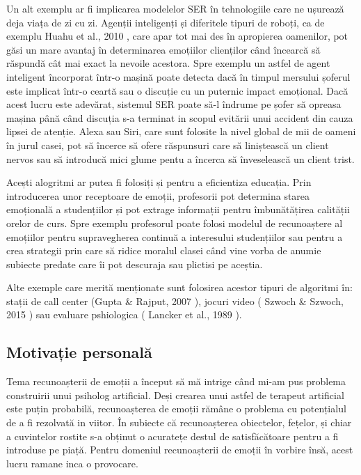 \documentclass[a4paper,12pt]{book}
\begin{document}
					Un alt exemplu ar fi implicarea modelelor SER în tehnologiile care ne ușurează deja viața de zi cu zi. Agenții inteligenți și diferitele tipuri de roboți, ca de exemplu Huahu et al., 2010 \cite{huahu}, care apar tot mai des în apropierea oamenilor, pot găsi un mare avantaj în determinarea emoțiilor clienților când încearcă să răspundă cât mai exact la nevoile acestora. Spre exemplu un astfel de agent inteligent încorporat într-o mașină poate detecta dacă în timpul mersului șoferul este implicat într-o ceartă sau o discuție cu un puternic impact emoțional. Dacă acest lucru este adevărat, sistemul SER poate să-l îndrume pe șofer să opreasa mașina până când discuția s-a terminat in scopul evitării unui accident din cauza lipsei de atenție. Alexa sau Siri, care sunt folosite la nivel  global de mii de oameni în jurul casei, pot să încerce să ofere răspunsuri care să liniștească un client nervos sau să introducă mici glume pentu a încerca să înveselească un client trist.\par 
					
					Acești alogritmi ar putea fi folosiți și pentru a eficientiza educația. Prin introducerea unor receptoare de emoții, profesorii pot determina starea emoțională a studențiilor și pot extrage informații pentru îmbunătățirea calității orelor de curs. Spre exemplu profesorul poate folosi modelul de recunoaștere al emoțiilor pentru supravegherea continuă a interesului studențiilor sau pentru a crea strategii prin care să ridice moralul clasei când vine vorba de anumie subiecte predate care îi pot descuraja sau plictisi pe aceștia. \par
					
					Alte exemple care merită menționate sunt folosirea acestor tipuri de algoritmi în: stații de call center (Gupta \& Rajput, 2007 \cite{gupta}), jocuri video ( Szwoch \& Szwoch, 2015 \cite{szwoch}) sau evaluare pshiologica ( Lancker et al., 1989 \cite{lancker} ). \par 							
			\subsection{Motivație personală}				
					Tema recunoașterii de emoții a început să mă intrige când mi-am pus problema construirii unui psiholog artificial. Deși crearea unui astfel de terapeut artificial este puțin probabilă, recunoașterea de emoții rămâne o problema cu potențialul de a fi rezolvată in viitor. În subiecte că recunoașterea obiectelor, fețelor, și chiar a cuvintelor rostite s-a obținut o acuratețe destul de satisfăcătoare pentru a fi introduse pe piață. Pentru domeniul recunoașterii de emoții în vorbire însă, acest lucru ramane inca o provocare. \par
					
\end{document}
